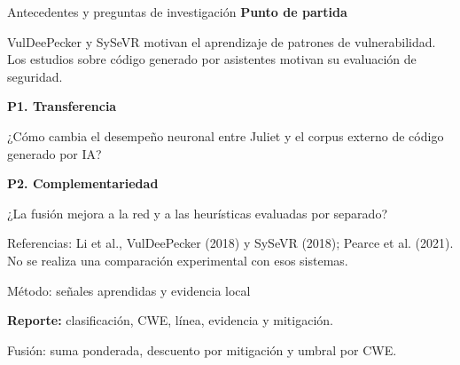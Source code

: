 \begin{frame}{Antecedentes y preguntas de investigación}
\small
\textbf{Punto de partida}\par\vspace{2mm}
VulDeePecker y SySeVR motivan el aprendizaje de patrones de vulnerabilidad. Los estudios sobre código generado por asistentes motivan su evaluación de seguridad.
\par\vspace{5mm}\normalsize
\textbf{P1. Transferencia}\par\vspace{2mm}
¿Cómo cambia el desempeño neuronal entre Juliet y el corpus externo de código generado por IA?
\par\vspace{4mm}
\textbf{P2. Complementariedad}\par\vspace{2mm}
¿La fusión mejora a la red y a las heurísticas evaluadas por separado?
\par\vspace{5mm}\scriptsize
Referencias: Li et al., VulDeePecker (2018) y SySeVR (2018); Pearce et al. (2021). No se realiza una comparación experimental con esos sistemas.
\end{frame}

\begin{frame}{Método: señales aprendidas y evidencia local}
\centering
{}
\par\vspace{3mm}
\textbf{Reporte:} clasificación, CWE, línea, evidencia y mitigación.
\par\vspace{2mm}\small
Fusión: suma ponderada, descuento por mitigación y umbral por CWE.
\end{frame}

